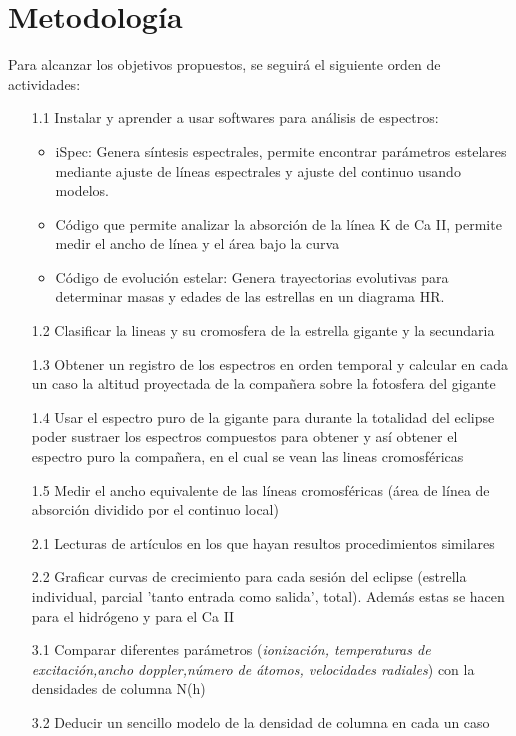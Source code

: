 \documentclass[11pt]{article}
\begin{document}
\section{Metodolog\'ia}

Para alcanzar los objetivos propuestos, se seguirá el siguiente orden de actividades:

\begin{itemize}

\item[1.1] Instalar y aprender a usar softwares para análisis de espectros:
\begin{itemize}
    \item iSpec: Genera síntesis espectrales, permite encontrar parámetros estelares mediante ajuste de líneas espectrales y ajuste del continuo usando modelos.
    \item Código que permite analizar la absorción de la línea K de Ca II, permite medir el ancho de línea y el área bajo la curva
    \item Código de evolución estelar: Genera trayectorias evolutivas para determinar masas y edades de las estrellas en un diagrama HR.
\end{itemize}
\item[1.2] Clasificar la lineas y su cromosfera de la estrella gigante y la secundaria
\item[1.3] Obtener un registro de los espectros en orden temporal y calcular en cada un caso la altitud proyectada de la compañera sobre la fotosfera del gigante

\item[1.4]  Usar el espectro puro de la gigante para durante la totalidad del eclipse poder sustraer los espectros compuestos para obtener y así obtener el espectro puro la compañera, en el cual se vean las lineas cromosféricas

\item[1.5] Medir el ancho equivalente de las líneas cromosféricas (área de línea de absorción dividido por el continuo local)

\item[2.1] Lecturas de artículos en los que hayan resultos procedimientos similares

\item[2.2] Graficar curvas de crecimiento para cada sesión del eclipse (estrella individual, parcial 'tanto entrada como salida', total). Además estas se hacen para el hidrógeno y para el Ca II 
\item[3.1] Comparar diferentes parámetros (\textit{ionización, temperaturas de excitación,ancho doppler,número de átomos, velocidades radiales}) con la densidades de columna N(h)

\item[3.2] Deducir un sencillo modelo de la densidad de columna en cada un caso

 
\end{itemize}
\end{document}
